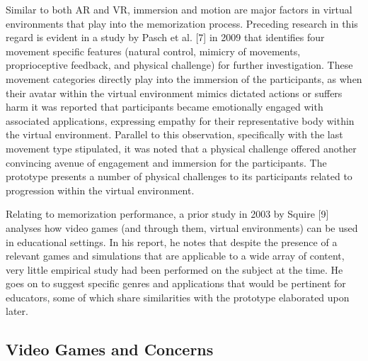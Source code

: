 \documentclass{vgtc}                          %
\begin{document}
Similar to both AR and VR, immersion and motion are major factors in virtual environments that play into the memorization process. Preceding research in this regard is evident in a study by Pasch et al. [7] in 2009 that identifies four movement specific features (natural control, mimicry of movements, proprioceptive feedback, and physical challenge) for further investigation. These movement categories directly play into the immersion of the participants, as when their avatar within the virtual environment mimics dictated actions or suffers harm it was reported that participants became emotionally engaged with associated applications, expressing empathy for their representative body within the virtual environment. Parallel to this observation, specifically with the last movement type stipulated, it was noted that a physical challenge offered another convincing avenue of engagement and immersion for the participants. The prototype presents a number of physical challenges to its participants related to progression within the virtual environment.

Relating to memorization performance, a prior study in 2003 by Squire [9] analyses how video games (and through them, virtual environments) can be used in educational settings. In his report, he notes that despite the presence of a relevant games and simulations that are applicable to a wide array of content, very little empirical study had been performed on the subject at the time. He goes on to suggest specific genres and applications that would be pertinent for educators, some of which share similarities with the prototype elaborated upon later.

\subsection{Video Games and Concerns}
\end{document}
